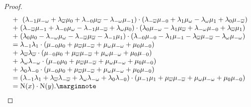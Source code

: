 \begin{proof}
\begin{equation*}
\begin{array}{r@{\;}c@{\;}l}
			&+& \  (\lambda_{-1} \mu_{-\omega} + \lambda_{\bar{\omega}} \mu_0 + 
			\lambda_{-0} \mu_{\bar{\omega}} - \lambda_{-\omega} \mu_{-1}) \cdot
			(\lambda_{-\bar{\omega}} \mu_{-0} + \lambda_1 \mu_{\omega} - 
				\lambda_{\omega} \mu_1 + 
				\lambda_0 \mu_{-\bar{\omega}})  \\
				
			&+  &  (\lambda_{-\bar{\omega}} \mu_{-1} + \lambda_{-0} \mu_{\omega} - 
						\lambda_{-1} \mu_{-\bar{\omega}} + \lambda_{\omega} \mu_0)\cdot
					(\lambda_0 \mu_{-\omega} - \lambda_1 \mu_{\bar{\omega}} + \lambda_{-\omega}
			\mu_{-0} + \lambda_{\bar{\omega}} \mu_1) \\
			
			& + &  (\lambda_0 \mu_0 - \lambda_{-\omega} \mu_{\omega} - 
				\lambda_{-\bar{\omega}} \mu_{\bar{\omega}} - \lambda_{-1} \mu_1)\cdot
				(\lambda_{-0} \mu_{-0} - \lambda_1 \mu_{-1} - 
	\lambda_{\bar{\omega}} \mu_{-\bar{\omega}}-\lambda_{\omega}\mu_{-\omega}) \\ 

			& = & \lambda_{-1} \lambda_1 \cdot (\mu_{-0} \mu_0 + \mu_{\bar{\omega}} 
			\mu_{-\bar{\omega}} + \mu_{\omega} \mu_{-\omega} + \mu_{0} \mu_{-0}) \\
			
			& + &  \lambda_{\bar{\omega}} \lambda_{\bar{\omega}} \cdot
			(\mu_{-0} \mu_0 + \mu_{\bar{\omega}} \mu_{-\bar{\omega}} + \mu_{\omega} \mu_{-\omega}
		+ \mu_{0} \mu_{-0}) \\
		
			& + &  \lambda_{\omega} \lambda_{-\omega} \cdot (\mu_{-0} \mu_0 + \mu_{\bar{\omega}} 
			\mu_{-\bar{\omega}} + \mu_{\omega} \mu_{-\omega} + \mu_{0} \mu_{-0}) \\
			
			& + &  \lambda_{0} \lambda_{-0} \cdot (\mu_{-0} \mu_0 + \mu_{\bar{\omega}} 
			\mu_{-\bar{\omega}} + \mu_{\omega} \mu_{-\omega} + \mu_{0} \mu_{-0}) \\
			
			& = & (\lambda_{-1} \lambda_1+ \lambda_{\bar{\omega}} \lambda_{-\bar{\omega}} +
			 \lambda_{\omega} \lambda_{-\omega} + \lambda_{0} \lambda_{-0})\cdot
			 (\mu_{-1} \mu_1 + \mu_{\bar{\omega}} \mu_{-\bar{\omega}} + \mu_{\omega} \mu_{-\omega}
			 + \mu_{0} \mu_{-0}) \\
			 
			& = & \NN(x) \cdot \NN(y). \marginqed
		\end{array}
	\end{equation*}
	\let\qed\relax
\end{proof}
